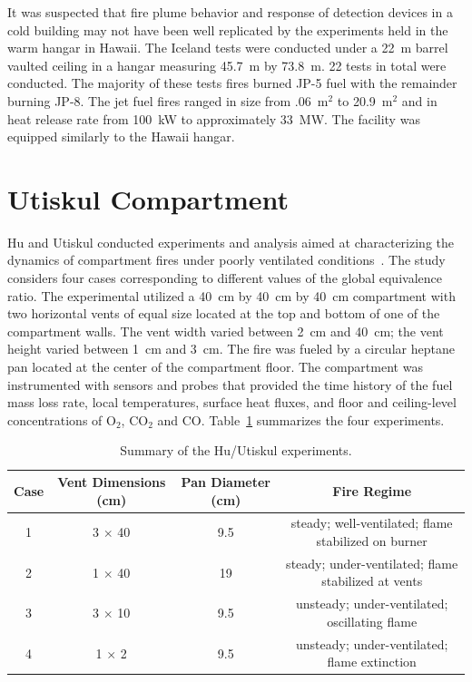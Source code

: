 It was suspected that fire plume behavior and response of detection devices in a cold building may not have been well replicated by the experiments held in the warm hangar in Hawaii. The Iceland tests were conducted under a 22~m barrel vaulted ceiling in a hangar measuring 45.7~m by 73.8~m. 22 tests in total were conducted. The majority of these tests fires burned JP-5 fuel with the remainder burning JP-8. The jet fuel fires ranged in size from .06~m$^2$ to 20.9~m$^2$ and in heat release rate from 100~kW to approximately 33~MW. The facility was equipped similarly to the Hawaii hangar.



\section{Utiskul Compartment}
\label{Utiskul_Compartment_Description}

Hu and Utiskul conducted experiments and analysis aimed at characterizing the dynamics of compartment fires under poorly ventilated conditions~\cite{Hu:2005,Hu:2007}. The study considers four cases corresponding to different values of the global equivalence ratio. The experimental utilized a 40~cm by 40~cm by 40~cm compartment with two horizontal vents of equal size located at the top and bottom of one of the compartment walls. The vent width varied between 2~cm and 40~cm; the vent height varied between 1~cm and 3~cm. The fire was fueled by a circular heptane pan located at the center of the compartment floor. The compartment was instrumented with sensors and probes that provided the time history of the fuel mass loss rate, local temperatures, surface heat fluxes, and floor and ceiling-level concentrations of O$_2$, CO$_2$ and CO. Table~\ref{Hu_Summary} summarizes the four experiments.

\begin{table}[h!]
\centering
\caption[Summary of the Hu/Utiskul experiments]{Summary of the Hu/Utiskul experiments.}
\begin{tabular}{|c|c|c|c|}
\hline
Case    & Vent Dimensions (cm)  & Pan Diameter (cm)  & Fire Regime                                           \\ \hline \hline
1       & 3 $\times$ 40         & 9.5                & steady; well-ventilated; flame stabilized on burner   \\ \hline
2       & 1 $\times$ 40         & 19                 & steady; under-ventilated; flame stabilized at vents   \\ \hline
3       & 3 $\times$ 10         & 9.5                & unsteady; under-ventilated; oscillating flame         \\ \hline
4       & 1 $\times$ 2          & 9.5                & unsteady; under-ventilated; flame extinction          \\ \hline
\end{tabular}
\label{Hu_Summary}
\end{table}

